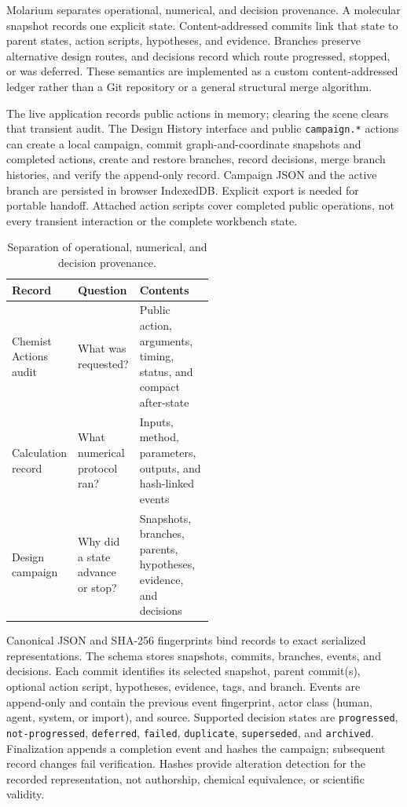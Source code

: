 \documentclass[11pt]{article}
\begin{document}
\begin{small}
Molarium separates operational, numerical, and decision provenance. A molecular snapshot records one explicit state. Content-addressed commits link that state to parent states, action scripts, hypotheses, and evidence. Branches preserve alternative design routes, and decisions record which route progressed, stopped, or was deferred. These semantics are implemented as a custom content-addressed ledger rather than a Git repository or a general structural merge algorithm.

The live application records public actions in memory; clearing the scene clears that transient audit. The Design History interface and public \texttt{campaign.*} actions can create a local campaign, commit graph-and-coordinate snapshots and completed actions, create and restore branches, record decisions, merge branch histories, and verify the append-only record. Campaign JSON and the active branch are persisted in browser IndexedDB. Explicit export is needed for portable handoff. Attached action scripts cover completed public operations, not every transient interaction or the complete workbench state.

\begin{table}[htbp]
\centering\small
\caption{Separation of operational, numerical, and decision provenance.}
\label{tab:appA_provenance}
\begin{tabularx}{\linewidth}{@{}p{0.24\linewidth}p{0.27\linewidth}X@{}}
\toprule
\textbf{Record} & \textbf{Question} & \textbf{Contents}\\
\midrule
Chemist Actions audit & What was requested? & Public action, arguments, timing, status, and compact after-state\\
Calculation record & What numerical protocol ran? & Inputs, method, parameters, outputs, and hash-linked events\\
Design campaign & Why did a state advance or stop? & Snapshots, branches, parents, hypotheses, evidence, and decisions\\
\bottomrule
\end{tabularx}
\end{table}

Canonical JSON and SHA-256 fingerprints bind records to exact serialized representations. The  schema stores snapshots, commits, branches, events, and decisions. Each commit identifies its selected snapshot, parent commit(s), optional action script, hypotheses, evidence, tags, and branch. Events are append-only and contain the previous event fingerprint, actor class (human, agent, system, or import), and source. Supported decision states are \texttt{progressed}, \texttt{not-progressed}, \texttt{deferred}, \texttt{failed}, \texttt{duplicate}, \texttt{superseded}, and \texttt{archived}. Finalization appends a completion event and hashes the campaign; subsequent record changes fail verification. Hashes provide alteration detection for the recorded representation, not authorship, chemical equivalence, or scientific validity.


\end{small}
\end{document}
